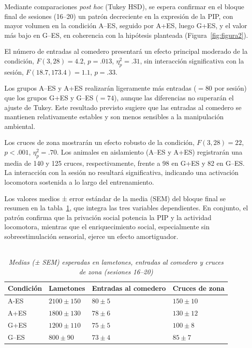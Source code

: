 \documentclass[12pt,a4paper]{article}
\begin{document}
\begin{multicols}{2}
Mediante comparaciones \textit{post hoc} (Tukey HSD), se espera confirmar en el bloque final de sesiones (16–20) un patrón decreciente en la expresión de la PIP, con mayor volumen en la condición A--ES, seguido por A+ES, luego G+ES, y el valor más bajo en G--ES, en coherencia con la hipótesis planteada (Figura~\ref{fig:figura2}).

El número de entradas al comedero presentará un efecto principal moderado de la condición, $F(3, 28) = 4.2$, $p = .013$, $\eta^2_p = .31$, sin interacción significativa con la sesión, $F(18.7, 173.4) = 1.1$, $p = .33$.

Los grupos A--ES y A+ES realizarán ligeramente más entradas ($= 80$ por sesión) que los grupos G+ES y G--ES ($= 74$), aunque las diferencias no superarán el ajuste de Tukey. Este resultado previsto sugiere que las entradas al comedero se mantienen relativamente estables y son menos sensibles a la manipulación ambiental.

Los cruces de zona mostrarán un efecto robusto de la condición, $F(3, 28) = 22$, $p < .001$, $\eta^2_p = .70$. Los animales en aislamiento (A--ES y A+ES) registrarán una media de 140 y 125 cruces, respectivamente, frente a 98 en G+ES y 82 en G--ES. La interacción con la sesión no resultará significativa, indicando una activación locomotora sostenida a lo largo del entrenamiento.

Los valores medios ± error estándar de la media (SEM) del bloque final se resumen en la tabla~\ref{tab:tabla1}, que integra las tres variables dependientes. En conjunto, el patrón confirma que la privación social potencia la PIP y la actividad locomotora, mientras que el enriquecimiento social, especialmente sin sobreestimulación sensorial, ejerce un efecto amortiguador.


\begin{table}[t]
    \centering
    \begin{doublespace}
    \captionsetup{labelfont=bf, labelsep=none}
    \caption{\textit{\protect\\Medias (± SEM) esperadas en lametones, entradas al comedero y cruces de zona (sesiones 16--20)}}
    \label{tab:tabla1}
    \end{doublespace}
    \begin{tabularx}{\textwidth}{lXXX}
    \toprule
    \textbf{Condición} & \textbf{Lametones} & \textbf{Entradas al comedero} & \textbf{Cruces de zona} \\
    \midrule
    A-ES   & $2100 \pm 150$ & $80 \pm 5$ & $150 \pm 10$ \\
    A+ES  & $1800 \pm 130$ & $78 \pm 6$ & $130 \pm 12$ \\
    G+ES  & $1200 \pm 110$ & $75 \pm 5$ & $100 \pm 8$ \\
    G--ES & $800 \pm 90$   & $73 \pm 4$ & $85 \pm 7$ \\
    \bottomrule
    \end{tabularx}
    \vspace{1mm}
\end{table}



\end{multicols}
\end{document}
